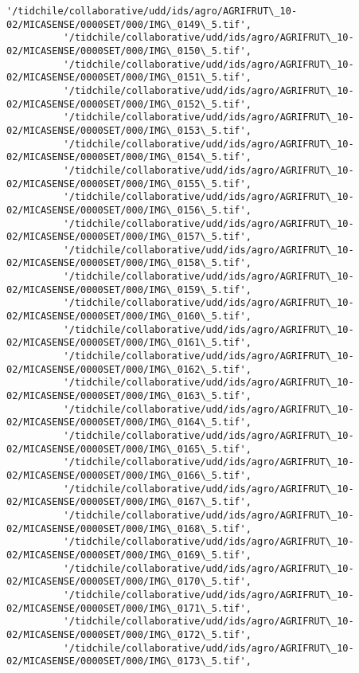 \documentclass[11pt]{article}
\begin{document}
\begin{Verbatim}[commandchars=\\\{\}]
          '/tidchile/collaborative/udd/ids/agro/AGRIFRUT\_10-02/MICASENSE/0000SET/000/IMG\_0149\_5.tif',
          '/tidchile/collaborative/udd/ids/agro/AGRIFRUT\_10-02/MICASENSE/0000SET/000/IMG\_0150\_5.tif',
          '/tidchile/collaborative/udd/ids/agro/AGRIFRUT\_10-02/MICASENSE/0000SET/000/IMG\_0151\_5.tif',
          '/tidchile/collaborative/udd/ids/agro/AGRIFRUT\_10-02/MICASENSE/0000SET/000/IMG\_0152\_5.tif',
          '/tidchile/collaborative/udd/ids/agro/AGRIFRUT\_10-02/MICASENSE/0000SET/000/IMG\_0153\_5.tif',
          '/tidchile/collaborative/udd/ids/agro/AGRIFRUT\_10-02/MICASENSE/0000SET/000/IMG\_0154\_5.tif',
          '/tidchile/collaborative/udd/ids/agro/AGRIFRUT\_10-02/MICASENSE/0000SET/000/IMG\_0155\_5.tif',
          '/tidchile/collaborative/udd/ids/agro/AGRIFRUT\_10-02/MICASENSE/0000SET/000/IMG\_0156\_5.tif',
          '/tidchile/collaborative/udd/ids/agro/AGRIFRUT\_10-02/MICASENSE/0000SET/000/IMG\_0157\_5.tif',
          '/tidchile/collaborative/udd/ids/agro/AGRIFRUT\_10-02/MICASENSE/0000SET/000/IMG\_0158\_5.tif',
          '/tidchile/collaborative/udd/ids/agro/AGRIFRUT\_10-02/MICASENSE/0000SET/000/IMG\_0159\_5.tif',
          '/tidchile/collaborative/udd/ids/agro/AGRIFRUT\_10-02/MICASENSE/0000SET/000/IMG\_0160\_5.tif',
          '/tidchile/collaborative/udd/ids/agro/AGRIFRUT\_10-02/MICASENSE/0000SET/000/IMG\_0161\_5.tif',
          '/tidchile/collaborative/udd/ids/agro/AGRIFRUT\_10-02/MICASENSE/0000SET/000/IMG\_0162\_5.tif',
          '/tidchile/collaborative/udd/ids/agro/AGRIFRUT\_10-02/MICASENSE/0000SET/000/IMG\_0163\_5.tif',
          '/tidchile/collaborative/udd/ids/agro/AGRIFRUT\_10-02/MICASENSE/0000SET/000/IMG\_0164\_5.tif',
          '/tidchile/collaborative/udd/ids/agro/AGRIFRUT\_10-02/MICASENSE/0000SET/000/IMG\_0165\_5.tif',
          '/tidchile/collaborative/udd/ids/agro/AGRIFRUT\_10-02/MICASENSE/0000SET/000/IMG\_0166\_5.tif',
          '/tidchile/collaborative/udd/ids/agro/AGRIFRUT\_10-02/MICASENSE/0000SET/000/IMG\_0167\_5.tif',
          '/tidchile/collaborative/udd/ids/agro/AGRIFRUT\_10-02/MICASENSE/0000SET/000/IMG\_0168\_5.tif',
          '/tidchile/collaborative/udd/ids/agro/AGRIFRUT\_10-02/MICASENSE/0000SET/000/IMG\_0169\_5.tif',
          '/tidchile/collaborative/udd/ids/agro/AGRIFRUT\_10-02/MICASENSE/0000SET/000/IMG\_0170\_5.tif',
          '/tidchile/collaborative/udd/ids/agro/AGRIFRUT\_10-02/MICASENSE/0000SET/000/IMG\_0171\_5.tif',
          '/tidchile/collaborative/udd/ids/agro/AGRIFRUT\_10-02/MICASENSE/0000SET/000/IMG\_0172\_5.tif',
          '/tidchile/collaborative/udd/ids/agro/AGRIFRUT\_10-02/MICASENSE/0000SET/000/IMG\_0173\_5.tif',

\end{Verbatim}
\end{document}
